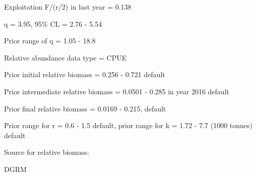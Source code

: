 \documentclass[12pt,a4paper]{article}\usepackage[]{graphicx}\usepackage[]{xcolor}
\begin{document}
Exploitation F/(r/2) in last year = 0.138

q = 3.95, 95\% CL = 2.76 - 5.54

Prior range of q = 1.05 - 18.8

Relative abundance data type = CPUE

Prior initial relative biomass = 0.256 - 0.721 default

Prior intermediate relative biomass = 0.0501 - 0.285 in year 2016 default

Prior final relative biomass = 0.0169 - 0.215, default

Prior range for r = 0.6 - 1.5 default, prior range for k = 1.72 - 7.7 (1000 tonnes) default

Source for relative biomass: 

DGRM

    
\end{document}
